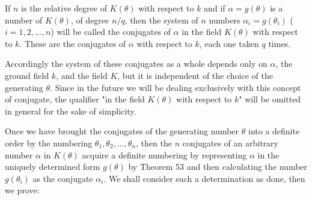 If $n$ is the relative degree of $K(\theta)$ with respect to $k$ and if $\alpha = g(\theta)$ is a number of $K(\theta)$, of degree $n/q$, then the system of $n$ numbers $\alpha_i = g(\theta_i)$ ($i = 1, 2, \ldots, n$) will be called the conjugates of $\alpha$ in the field $K(\theta)$ with respect to $k$. These are the conjugates of $\alpha$ with respect to $k$, each one taken $q$ times.

Accordingly the system of these conjugates as a whole depends only on $\alpha$, the ground field $k$, and the field $K$, but it is independent of the choice of the generating $\theta$. Since in the future we will be dealing exclusively with this concept of conjugate, the qualifier "in the field $K(\theta)$ with respect to $k$" will be omitted in general for the sake of simplicity.

Once we have brought the conjugates of the generating number $\theta$ into a definite order by the numbering $\theta_1, \theta_2, \ldots, \theta_n$, then the $n$ conjugates of an arbitrary number $\alpha$ in $K(\theta)$ acquire a definite numbering by representing $\alpha$ in the uniquely determined form $g(\theta)$ by Theorem 53 and then calculating the number $g(\theta_i)$ as the conjugate $\alpha_i$. We shall consider such a determination as done, then we prove:
